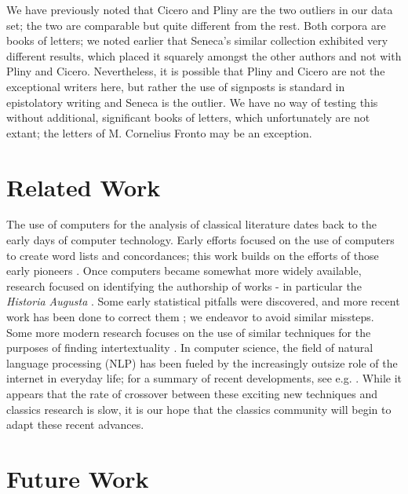 We have previously noted that Cicero and Pliny are the two outliers in our data set; the two are comparable but quite different from the rest. Both corpora are books of letters; we noted earlier that Seneca's similar collection exhibited very different results, which placed it squarely amongst the other authors and not with Pliny and Cicero. Nevertheless, it is possible that Pliny and Cicero are not the exceptional writers here, but rather the use of signposts is standard in epistolatory writing and Seneca is the outlier. We have no way of testing this without additional, significant books of letters, which unfortunately are not extant; the letters of M. Cornelius Fronto may be an exception.

\section{Related Work}
\label{sec:related}

The use of computers for the analysis of classical literature dates back to the early days of computer technology. Early efforts focused on the use of computers to create word lists and concordances; this work builds on the efforts of those early pioneers \cite{early}. Once computers became somewhat more widely available, research focused on identifying the authorship of works - in particular the \textit{Historia Augusta} \cite{marriott}. Some early statistical pitfalls were discovered, and more recent work has been done to correct them \cite{sansone} \cite{purple}; we endeavor to avoid similar missteps. Some more modern research focuses on the use of similar techniques for the purposes of finding intertextuality \cite{forstall}. In computer science, the field of natural language processing (NLP) has been fueled by the increasingly outsize role of the internet in everyday life; for a summary of recent developments, see e.g. \cite{nlp}. While it appears that the rate of crossover between these exciting new techniques and classics research is slow, it is our hope that the classics community will begin to adapt these recent advances.

\section{Future Work}
\label{sec:Future}


